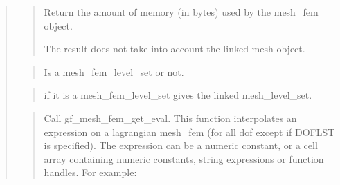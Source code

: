 \documentclass[a4paper,11pt,english]{sphinxmanual}
\begin{document}
\begin{quote}
\begin{quote}
\sphinxAtStartPar
Return the amount of memory (in bytes) used by the mesh\_fem object.

\sphinxAtStartPar
The result does not take into account the linked mesh object.
\end{quote}

\sphinxAtStartPar
{}
\begin{quote}

\sphinxAtStartPar
Is a mesh\_fem\_level\_set or not.
\end{quote}

\sphinxAtStartPar
{}
\begin{quote}

\sphinxAtStartPar
if it is a mesh\_fem\_level\_set gives the linked mesh\_level\_set.
\end{quote}

\sphinxAtStartPar
{}
\begin{quote}

\sphinxAtStartPar
Call gf\_mesh\_fem\_get\_eval. This function interpolates an expression on a
lagrangian mesh\_fem (for all dof except if DOFLST is specified).
The expression can be a
numeric constant, or a cell array containing numeric constants, string
expressions or function handles. For example:


\end{quote}
\end{quote}
\end{document}
